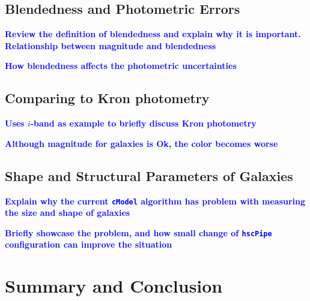 \documentclass[useamsfonts]{pasj01}
\def\hscpipe{\texttt{hscPipe}}
\def\cmodel{\texttt{cModel}}
\newcommand{\plan}[1]{\textcolor{blue} {\textbf{#1}}}
\begin{document}
\subsection{Blendedness and Photometric Errors}
    \label{ssec:blendedness}

    \plan{Review the definition of blendedness and explain why it is important.}
    \plan{Relationship between magnitude and blendedness}

    \plan{How blendedness affects the photometric uncertainties}

\subsection{Comparing to Kron photometry}

    \plan{Uses $i$-band as example to briefly discuss Kron photometry}

    \plan{Although magnitude for galaxies is Ok, the color becomes worse}

\subsection{Shape and Structural Parameters of Galaxies}
    \label{ssec:shape}

    \plan{Explain why the current \cmodel{}{} algorithm has problem with measuring
          the size and shape of galaxies}

    \plan{Briefly showcase the problem, and how small change of \hscpipe{}
          configuration can improve the situation}

\section{Summary and Conclusion}
    \label{sec:summary}
\end{document}
